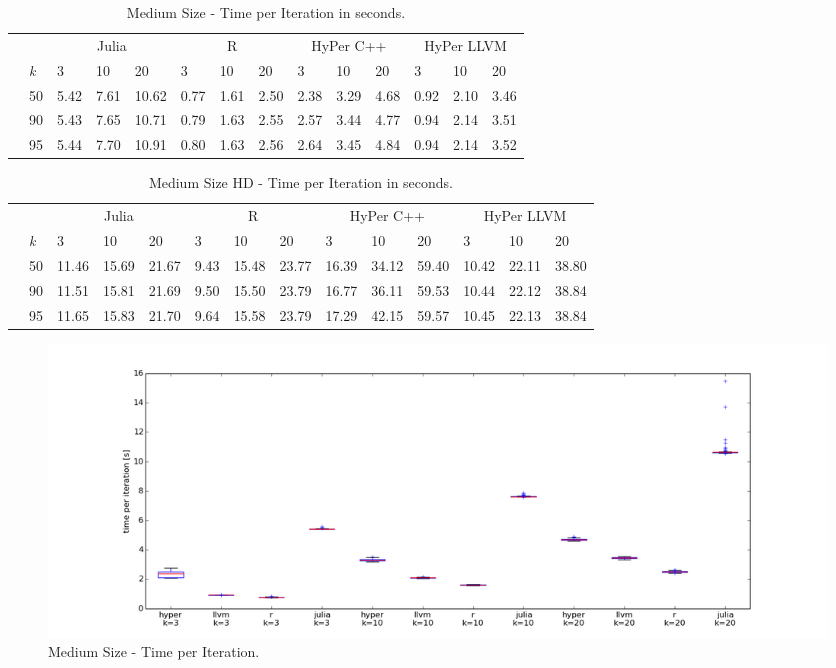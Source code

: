 \begin{table}[htsb]
  \caption[Medium Size - Time per Iteration]{Medium Size - Time per Iteration in seconds.}
  \label{tab:medium_all}
  \centering
  \begin{tabular}{l l l ll |l l l |l l l |l l l}
    \toprule
      && \multicolumn{3}{c}{Julia} & \multicolumn{3}{c}{R} & \multicolumn{3}{c}{HyPer C++} & \multicolumn{3}{c}{HyPer LLVM}  \\
      &\emph{k} & 3 & 10 & 20 & 3 & 10 & 20 & 3 & 10 & 20 & 3 & 10 & 20 \\
    \midrule
      \parbox[t]{2mm}{} &50  & 5.42 & 7.61 & 10.62 & 0.77 & 1.61 & 2.50 & 2.38 & 3.29 & 4.68 & 0.92 & 2.10 & 3.46 \\
      &90  & 5.43 & 7.65 & 10.71 & 0.79 & 1.63 & 2.55 & 2.57 & 3.44 & 4.77 & 0.94 & 2.14 & 3.51 \\
      &95  & 5.44 & 7.70 & 10.91 & 0.80 & 1.63 & 2.56 & 2.64 & 3.45 & 4.84 & 0.94 & 2.14 & 3.52 \\
    \bottomrule
  \end{tabular}
\end{table}

\begin{table}[htsb]
  \caption[Medium Size HD - Time per Iteration]{Medium Size HD - Time per Iteration in seconds.}
  \label{tab:medium_hd_all}
  \centering
  \begin{tabular}{lllll|l l l|l l l|l l l}
    \toprule
      & & \multicolumn{3}{c}{Julia} & \multicolumn{3}{c}{R} & \multicolumn{3}{c}{HyPer C++} & \multicolumn{3}{c}{HyPer LLVM}  \\
      & \emph{k} & 3 & 10 & 20 & 3 & 10 & 20 & 3 & 10 & 20 & 3 & 10 & 20 \\
    \midrule
      \parbox[t]{2mm}{} & 50  & 11.46 & 15.69 & 21.67 & 9.43 & 15.48 & 23.77 & 16.39 & 34.12 & 59.40 & 10.42 & 22.11 & 38.80 \\
     & 90  & 11.51 & 15.81 & 21.69 & 9.50 & 15.50 & 23.79 & 16.77 & 36.11 & 59.53 & 10.44 & 22.12 & 38.84 \\
     & 95  & 11.65 & 15.83 & 21.70 & 9.64 & 15.58 & 23.79 & 17.29 & 42.15 & 59.57 & 10.45 & 22.13 & 38.84 \\
    \bottomrule
  \end{tabular}
\end{table}


\begin{figure}[htsb]
  \centerline{
    \includegraphics[scale=0.4, trim="0cm 1cm 0cm 0cm"]{figures/charts/15M_all}
  }
  \caption[Medium Size - Time per Iteration]{Medium Size - Time per Iteration.}
  \label{fig:15M_all}
\end{figure}


